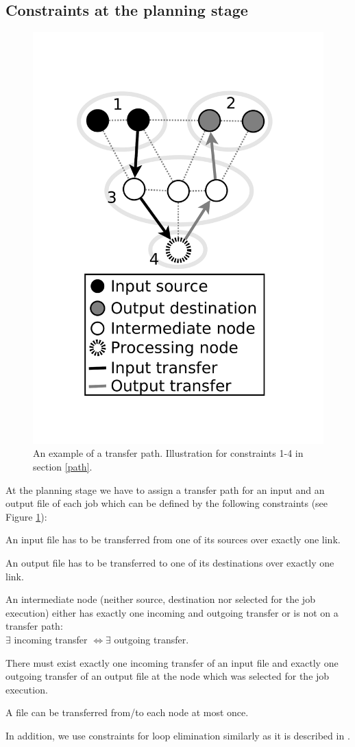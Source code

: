 \documentclass[english]{ddny}
\begin{document}
\subsection{Constraints at the planning stage}
\begin{figure}[h]
\centering
    \includegraphics [trim =30mm 35mm 30mm 40mm ,clip, width=.4\textwidth]{pic/link_selection_bw3.pdf}	
    \caption{An example of a transfer path. Illustration for constraints 1-4 in section \ref{path}.  }
    \label{fig:path}
\end{figure}
At the planning stage we have to assign a transfer path for an input and an output file of each job which can be defined by the following constraints (see Figure \ref{fig:path}):
\begin{description}
\label{path}
		\item[1.] An input file has to be transferred from one of its sources over exactly one link.
		\item[2.] An output file has to be transferred to one of its destinations over exactly one link.
		\item[3.] An intermediate node (neither source, destination nor selected for the job execution) either has exactly one incoming and outgoing transfer or is not on a transfer path:\\ $\exists$ incoming transfer $\Leftrightarrow \exists$ outgoing transfer. 
		\item[4.] There must exist exactly one incoming transfer of an input file and exactly one outgoing transfer of an output file at the node which was selected for the job execution.	
		\item[5.] A file can be transferred from/to each node at most once.		
\end{description}
In addition, we use constraints for loop elimination similarly as it is described in \cite{Rudova}.
\end{document}
